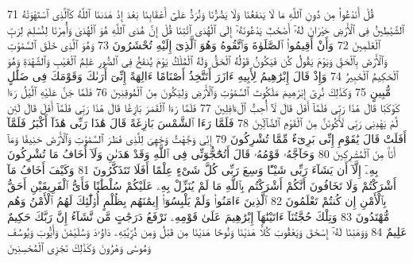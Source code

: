 {\tiny\colorbox{cl_aya}{71}} قُلْ أَنَدْعُوا۟ مِن دُونِ ٱللَّهِ مَا لَا يَنفَعُنَا وَلَا يَضُرُّنَا وَنُرَدُّ عَلَىٰٓ أَعْقَابِنَا بَعْدَ إِذْ هَدَىٰنَا ٱللَّهُ كَٱلَّذِى ٱسْتَهْوَتْهُ ٱلشَّيَٰطِينُ فِى ٱلْأَرْضِ حَيْرَانَ لَهُۥٓ أَصْحَٰبٌ يَدْعُونَهُۥٓ إِلَى ٱلْهُدَى ٱئْتِنَا قُلْ إِنَّ هُدَى ٱللَّهِ هُوَ ٱلْهُدَىٰ وَأُمِرْنَا لِنُسْلِمَ لِرَبِّ ٱلْعَٰلَمِينَ
{\tiny\colorbox{cl_aya}{72}} وَأَنْ أَقِيمُوا۟ ٱلصَّلَوٰةَ وَٱتَّقُوهُ وَهُوَ ٱلَّذِىٓ إِلَيْهِ تُحْشَرُونَ
{\tiny\colorbox{cl_aya}{73}} وَهُوَ ٱلَّذِى خَلَقَ ٱلسَّمَٰوَٰتِ وَٱلْأَرْضَ بِٱلْحَقِّ وَيَوْمَ يَقُولُ كُن فَيَكُونُ قَوْلُهُ ٱلْحَقُّ وَلَهُ ٱلْمُلْكُ يَوْمَ يُنفَخُ فِى ٱلصُّورِ عَٰلِمُ ٱلْغَيْبِ وَٱلشَّهَٰدَةِ وَهُوَ ٱلْحَكِيمُ ٱلْخَبِيرُ
{\tiny\colorbox{cl_aya}{74}} وَإِذْ قَالَ إِبْرَٰهِيمُ لِأَبِيهِ ءَازَرَ أَتَتَّخِذُ أَصْنَامًا ءَالِهَةً إِنِّىٓ أَرَىٰكَ وَقَوْمَكَ فِى ضَلَٰلٍ مُّبِينٍ
{\tiny\colorbox{cl_aya}{75}} وَكَذَٰلِكَ نُرِىٓ إِبْرَٰهِيمَ مَلَكُوتَ ٱلسَّمَٰوَٰتِ وَٱلْأَرْضِ وَلِيَكُونَ مِنَ ٱلْمُوقِنِينَ
{\tiny\colorbox{cl_aya}{76}} فَلَمَّا جَنَّ عَلَيْهِ ٱلَّيْلُ رَءَا كَوْكَبًا قَالَ هَٰذَا رَبِّى فَلَمَّآ أَفَلَ قَالَ لَآ أُحِبُّ ٱلْءَافِلِينَ
{\tiny\colorbox{cl_aya}{77}} فَلَمَّا رَءَا ٱلْقَمَرَ بَازِغًا قَالَ هَٰذَا رَبِّى فَلَمَّآ أَفَلَ قَالَ لَئِن لَّمْ يَهْدِنِى رَبِّى لَأَكُونَنَّ مِنَ ٱلْقَوْمِ ٱلضَّآلِّينَ
{\tiny\colorbox{cl_aya}{78}} فَلَمَّا رَءَا ٱلشَّمْسَ بَازِغَةً قَالَ هَٰذَا رَبِّى هَٰذَآ أَكْبَرُ فَلَمَّآ أَفَلَتْ قَالَ يَٰقَوْمِ إِنِّى بَرِىٓءٌ مِّمَّا تُشْرِكُونَ
{\tiny\colorbox{cl_aya}{79}} إِنِّى وَجَّهْتُ وَجْهِىَ لِلَّذِى فَطَرَ ٱلسَّمَٰوَٰتِ وَٱلْأَرْضَ حَنِيفًا وَمَآ أَنَا۠ مِنَ ٱلْمُشْرِكِينَ
{\tiny\colorbox{cl_aya}{80}} وَحَآجَّهُۥ قَوْمُهُۥ قَالَ أَتُحَٰٓجُّوٓنِّى فِى ٱللَّهِ وَقَدْ هَدَىٰنِ وَلَآ أَخَافُ مَا تُشْرِكُونَ بِهِۦٓ إِلَّآ أَن يَشَآءَ رَبِّى شَيْـًٔا وَسِعَ رَبِّى كُلَّ شَىْءٍ عِلْمًا أَفَلَا تَتَذَكَّرُونَ
{\tiny\colorbox{cl_aya}{81}} وَكَيْفَ أَخَافُ مَآ أَشْرَكْتُمْ وَلَا تَخَافُونَ أَنَّكُمْ أَشْرَكْتُم بِٱللَّهِ مَا لَمْ يُنَزِّلْ بِهِۦ عَلَيْكُمْ سُلْطَٰنًا فَأَىُّ ٱلْفَرِيقَيْنِ أَحَقُّ بِٱلْأَمْنِ إِن كُنتُمْ تَعْلَمُونَ
{\tiny\colorbox{cl_aya}{82}} ٱلَّذِينَ ءَامَنُوا۟ وَلَمْ يَلْبِسُوٓا۟ إِيمَٰنَهُم بِظُلْمٍ أُو۟لَٰٓئِكَ لَهُمُ ٱلْأَمْنُ وَهُم مُّهْتَدُونَ
{\tiny\colorbox{cl_aya}{83}} وَتِلْكَ حُجَّتُنَآ ءَاتَيْنَٰهَآ إِبْرَٰهِيمَ عَلَىٰ قَوْمِهِۦ نَرْفَعُ دَرَجَٰتٍ مَّن نَّشَآءُ إِنَّ رَبَّكَ حَكِيمٌ عَلِيمٌ
{\tiny\colorbox{cl_aya}{84}} وَوَهَبْنَا لَهُۥٓ إِسْحَٰقَ وَيَعْقُوبَ كُلًّا هَدَيْنَا وَنُوحًا هَدَيْنَا مِن قَبْلُ وَمِن ذُرِّيَّتِهِۦ دَاوُۥدَ وَسُلَيْمَٰنَ وَأَيُّوبَ وَيُوسُفَ وَمُوسَىٰ وَهَٰرُونَ وَكَذَٰلِكَ نَجْزِى ٱلْمُحْسِنِينَ
